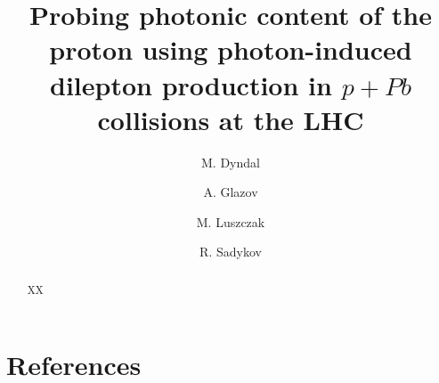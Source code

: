\documentclass[preprint,10pt]{elsarticle}
\begin{document}
\begin{frontmatter}
\title{Probing photonic content of the proton using photon-induced dilepton production in $p+Pb$ collisions at the LHC}


\author{M. Dyndal}
\address{DESY}
\author{A. Glazov}
\address{DESY}
\author{M. Luszczak}
\address{...}
\author{R. Sadykov}
\address{...}



\begin{abstract}
XX
\end{abstract}



\end{frontmatter}












\section*{References}


\end{document}
